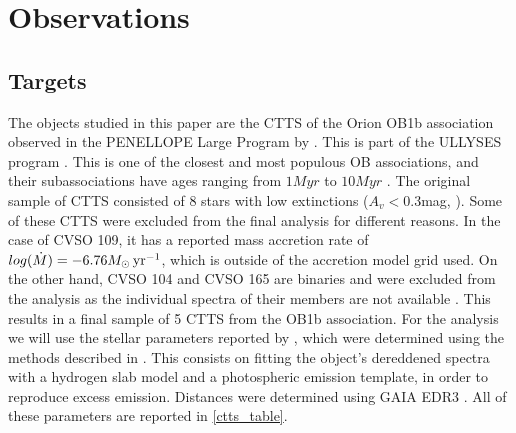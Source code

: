 \documentclass[twocolumn,linenumbers]{aastex631}
\newcommand{\msunyr}{M_{\sun} \, \rm{ yr^{-1}}}
\begin{document}
\section{Observations} \label{Sample and observations}

\subsection{Targets}
The objects studied in this paper are the CTTS of the Orion OB1b association observed in the PENELLOPE Large Program by \citep{manara2021}. This is part of the ULLYSES program \citep{roman-duval2020}. This is one of the closest and most populous OB associations, and their subassociations have ages ranging from $1Myr$ to $10Myr$ \citep{blaauw1994}. The original sample of CTTS consisted of 8 stars with low extinctions ($A_v < 0.3$mag, \citet{briceno2019}). Some of these CTTS were excluded from the final analysis for different reasons. In the case of CVSO 109, it has a reported mass accretion rate of $log(\dot{M})= -6.76\msunyr$, which is outside of the accretion model grid used. On the other hand, CVSO 104 and CVSO 165 are binaries and were excluded from the analysis as the individual spectra of their members are not available \citep{manara2021a}. This results in a final sample of 5 CTTS from the OB1b association. For the analysis we will use the stellar parameters reported by \citet{manara2021}, which were determined using the methods described in \citep{manara2013a}. This consists on fitting the object's dereddened spectra with a hydrogen slab model and a photospheric emission template, in order to reproduce excess emission. Distances were determined using GAIA EDR3 \citep{gaia2016,gaia2021}. All of these parameters are reported in \ref{ctts_table}. 
\end{document}
